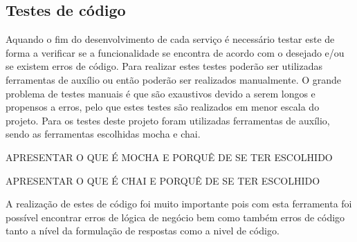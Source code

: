 \subsection{Testes de código}
Aquando o fim do desenvolvimento de cada serviço é necessário testar este de forma a verificar se a funcionalidade se encontra de acordo com o desejado e/ou se existem erros de código. Para realizar estes testes poderão ser utilizadas ferramentas de auxílio ou então poderão ser realizados manualmente. O grande problema de testes manuais é que são exaustivos devido a serem longos e propensos a erros, pelo que estes testes são realizados em menor escala do projeto. Para os testes deste projeto foram utilizadas ferramentas de auxílio, sendo as ferramentas escolhidas mocha e chai.

APRESENTAR O QUE É MOCHA E PORQUÊ DE SE TER ESCOLHIDO

APRESENTAR O QUE É CHAI E PORQUÊ DE SE TER ESCOLHIDO

A realização de estes de código foi muito importante pois com esta ferramenta foi possível encontrar erros de lógica de negócio bem como também erros de código tanto a nível da formulação de respostas como a nivel de código.



